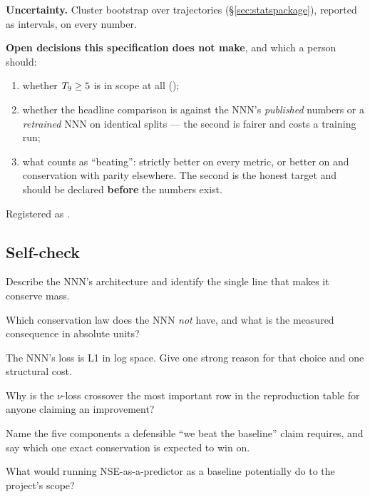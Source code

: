 \textbf{Uncertainty.} Cluster bootstrap over trajectories
(\S\ref{sec:statspackage}), reported as intervals, on every number.

\textbf{Open decisions this specification does not make}, and which a person
should:

\begin{enumerate}
\item whether $T_{9} \ge 5$ is in scope at all ();
\item whether the headline comparison is against the NNN's \emph{published}
  numbers or a \emph{retrained} NNN on identical splits --- the second is
  fairer and costs a training run;
\item what counts as ``beating'': strictly better on every metric, or better on
  \Ye{} and conservation with parity elsewhere. The second is the honest target
  and should be declared \textbf{before} the numbers exist.
\end{enumerate}

Registered as .

\subsection{Self-check}
\label{sec:selfcheck-baseline}

\begin{selfcheck}
\item %
  Describe the NNN's architecture and identify the single line that makes it
  conserve mass.
\item %
  Which conservation law does the NNN \emph{not} have, and what is the measured
  consequence in absolute units?
\item %
  The NNN's loss is L1 in log space. Give one strong reason for that choice and
  one structural cost.
\item %
  Why is the $\nu$-loss crossover the most important row in the reproduction
  table for anyone claiming an improvement?
\item %
  Name the five components a defensible ``we beat the baseline'' claim
  requires, and say which one exact conservation is expected to win on.
\item %
  What would running NSE-as-a-predictor as a baseline potentially do to the
  project's scope?
\end{selfcheck}
